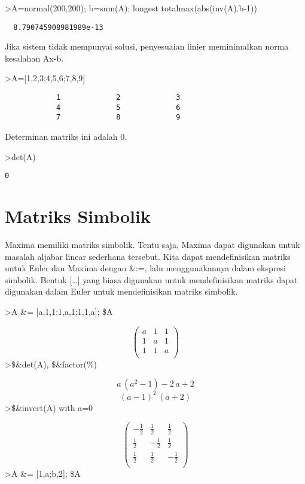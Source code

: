 \documentclass[
]{book}
\begin{document}
\textgreater A=normal(200,200); b=sum(A); longest totalmax(abs(inv(A).b-1))

\begin{verbatim}
  8.790745908981989e-13 
\end{verbatim}

Jika sistem tidak mempunyai solusi, penyesuaian linier meminimalkan norma kesalahan Ax-b.

\textgreater A={[}1,2,3;4,5,6;7,8,9{]}

\begin{verbatim}
            1             2             3 
            4             5             6 
            7             8             9 
\end{verbatim}

Determinan matriks ini adalah 0.

\textgreater det(A)

\begin{verbatim}
0
\end{verbatim}

\chapter{Matriks Simbolik}\label{matriks-simbolik}

Maxima memiliki matriks simbolik. Tentu saja, Maxima dapat digunakan untuk masalah aljabar linear sederhana tersebut. Kita dapat mendefinisikan matriks untuk Euler dan Maxima dengan \&:=, lalu menggunakannya dalam ekspresi simbolik. Bentuk {[}\ldots{]} yang biasa digunakan untuk mendefinisikan matriks dapat digunakan dalam Euler untuk mendefinisikan matriks simbolik.

\textgreater A \&= {[}a,1,1;1,a,1;1,1,a{]}; \$A

\[\begin{pmatrix}a & 1 & 1 \\ 1 & a & 1 \\ 1 & 1 & a \\ \end{pmatrix}\]\textgreater\$\&det(A), \$\&factor(\%)

\[a\,\left(a^2-1\right)-2\,a+2\] \[\left(a-1\right)^2\,\left(a+2\right)\]\textgreater\$\&invert(A) with a=0

\[\begin{pmatrix}-\frac{1}{2} & \frac{1}{2} & \frac{1}{2} \\ \frac{1}{2} & -\frac{1}{2} & \frac{1}{2} \\ \frac{1}{2} & \frac{1}{2} & -\frac{1}{2} \\ \end{pmatrix}\]\textgreater A \&= {[}1,a;b,2{]}; \$A
\end{document}
